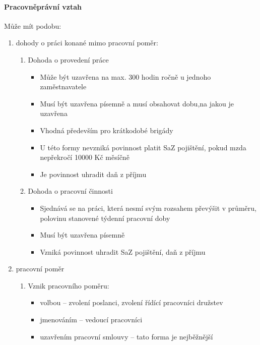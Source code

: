 \paragraph*{Pracovněprávní vztah}
Může mít podobu:
\begin{enumerate}
    \item dohody o práci konané mimo pracovní poměr:
        \begin{enumerate}
            \item Dohoda o provedení práce
                \begin{itemize} 
                    \item Může být uzavřena na max. 300 hodin ročně u jednoho zaměstnavatele
                    \item Musí být uzavřena písemně a musí obsahovat dobu,na jakou je uzavřena
                    \item Vhodná především pro krátkodobé brigády
                    \item U této formy nevzniká povinnost platit SaZ pojištění, pokud mzda nepřekročí 10000 Kč měsíčně
                    \item Je povinnost uhradit daň z příjmu
                \end{itemize}
            \item Dohoda o pracovní činnosti
                \begin{itemize}
                    \item Sjednává se na práci, která nesmí svým rozsahem převýšit v průměru, polovinu stanovené týdenní pracovní doby
                    \item Musí být uzavřena písemně
                    \item Vzniká povinnost uhradit SaZ pojištění, daň z příjmu
                \end{itemize}
        \end{enumerate}
    \item pracovní poměr
        \begin{enumerate}
            \item Vznik pracovního poměru:
                \begin{itemize}
                    \item volbou -- zvolení poslanci, zvolení řídící pracovníci družstev
                    \item jmenováním -- vedoucí pracovníci
                    \item uzavřením pracovní smlouvy -- tato forma je nejběžnější

\end{itemize}
\end{enumerate}
\end{enumerate}

